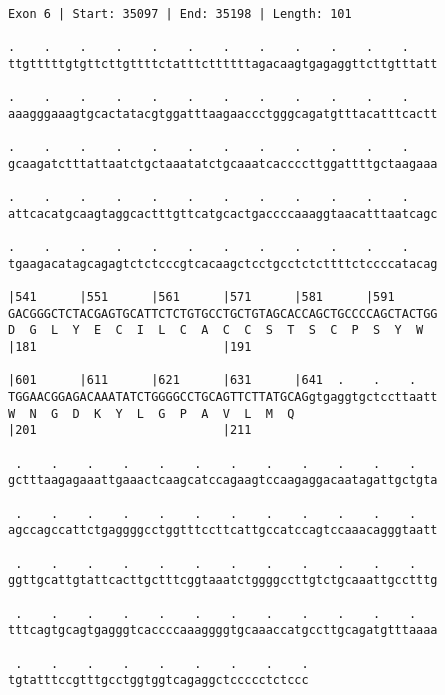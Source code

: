 \documentclass{article}
\begin{document}
\begin{Verbatim}
Exon 6 | Start: 35097 | End: 35198 | Length: 101
 
.    .    .    .    .    .    .    .    .    .    .    .    
ttgtttttgtgttcttgttttctatttcttttttagacaagtgagaggttcttgtttatt
  
.    .    .    .    .    .    .    .    .    .    .    .    
aaagggaaagtgcactatacgtggatttaagaaccctgggcagatgtttacatttcactt
  
.    .    .    .    .    .    .    .    .    .    .    .    
gcaagatctttattaatctgctaaatatctgcaaatcaccccttggattttgctaagaaa
  
.    .    .    .    .    .    .    .    .    .    .    .    
attcacatgcaagtaggcactttgttcatgcactgaccccaaaggtaacatttaatcagc
  
.    .    .    .    .    .    .    .    .    .    .    .    
tgaagacatagcagagtctctcccgtcacaagctcctgcctctcttttctccccatacag
  
|541      |551      |561      |571      |581      |591      
GACGGGCTCTACGAGTGCATTCTCTGTGCCTGCTGTAGCACCAGCTGCCCCAGCTACTGG
D  G  L  Y  E  C  I  L  C  A  C  C  S  T  S  C  P  S  Y  W  
|181                          |191                          
  
|601      |611      |621      |631      |641  .    .    .   
TGGAACGGAGACAAATATCTGGGGCCTGCAGTTCTTATGCAGgtgaggtgctccttaatt
W  N  G  D  K  Y  L  G  P  A  V  L  M  Q                    
|201                          |211                          
  
 .    .    .    .    .    .    .    .    .    .    .    .   
gctttaagagaaattgaaactcaagcatccagaagtccaagaggacaatagattgctgta
  
 .    .    .    .    .    .    .    .    .    .    .    .   
agccagccattctgaggggcctggtttccttcattgccatccagtccaaacagggtaatt
  
 .    .    .    .    .    .    .    .    .    .    .    .   
ggttgcattgtattcacttgctttcggtaaatctggggccttgtctgcaaattgcctttg
  
 .    .    .    .    .    .    .    .    .    .    .    .   
tttcagtgcagtgagggtcaccccaaaggggtgcaaaccatgccttgcagatgtttaaaa
  
 .    .    .    .    .    .    .    .    .
tgtatttccgtttgcctggtggtcagaggctccccctctccc
\end{Verbatim}
\newpage
\end{document}
